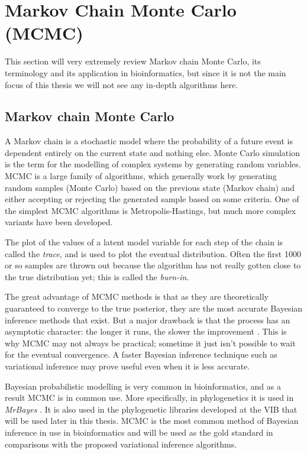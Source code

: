 \newpage
\section{Markov Chain Monte Carlo (MCMC)}

This section will very extremely review Markov chain Monte Carlo, its terminology and its application in bioinformatics, but since it is not the main focus of this thesis we will not see any in-depth algorithms here.

\subsection{Markov chain Monte Carlo}
A Markov chain is a stochastic model where the probability of a future event is dependent entirely on the current state and nothing else. Monte Carlo simulation is the term for the modelling of complex systems by generating random variables. MCMC is a large family of algorithms, which generally work by generating random samples (Monte Carlo) based on the previous state (Markov chain) and either accepting or rejecting the generated sample based on some criteria. One of the simplest MCMC algorithms is Metropolis-Hastings, but much more complex variants have been developed. 

\medskip
\par The plot of the values of a latent model variable for each step of the chain is called the \textit{trace}, and is used to plot the eventual distribution. Often the first 1000 or so samples are thrown out because the algorithm has not really gotten close to the true distribution yet; this is called the \textit{burn-in}.

\medskip
\par The great advantage of MCMC methods is that as they are theoretically guaranteed to converge to the true posterior, they are the most accurate Bayesian inference methods that exist. But a major drawback is that the process has an asymptotic character: the longer it runs, the slower the improvement \parencite{mcmc}. This is why MCMC may not always be practical; sometime it just isn't possible to wait for the eventual convergence. A faster Bayesian inference technique such as variational inference may prove useful even when it is less accurate.

\medskip
\par Bayesian probabilistic modelling is very common in bioinformatics, and as a result MCMC is in common use. More specifically, in phylogenetics it is used in \textit{MrBayes} \parencite{mrbayes}. It is also used in the phylogenetic libraries developed at the VIB that will be used later in this thesis. MCMC is the most common method of Bayesian inference in use in bioinformatics and will be used as the gold standard in comparisons with the proposed variational inference algorithms.